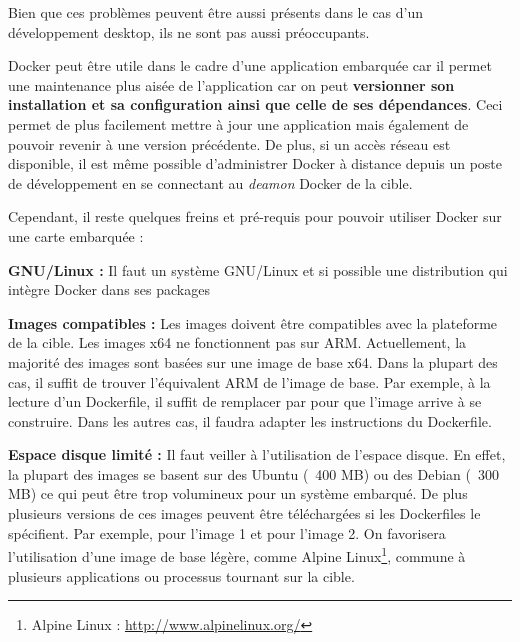 Bien que ces problèmes peuvent être aussi présents dans le cas d'un développement desktop, ils ne sont pas aussi préoccupants.

Docker peut être utile dans le cadre d'une application embarquée car il permet une maintenance plus aisée de l'application car on peut \textbf{versionner son installation et sa configuration ainsi que celle de ses dépendances}. Ceci permet de plus facilement mettre à jour une application mais également de pouvoir revenir à une version précédente. De plus, si un accès réseau est disponible, il est même possible d'administrer Docker à distance depuis un poste de développement en se connectant au \textit{deamon} Docker de la cible.

Cependant, il reste quelques freins et pré-requis pour pouvoir utiliser Docker sur une carte embarquée :

\textbf{GNU/Linux : } Il faut un système GNU/Linux et si possible une distribution qui intègre Docker dans ses packages

\textbf{Images compatibles : } Les images doivent être compatibles avec la plateforme de la cible. Les images x64 ne fonctionnent pas sur ARM. Actuellement, la majorité des images sont basées sur une image de base x64. Dans la plupart des cas, il suffit de trouver l'équivalent ARM de l'image de base. Par exemple, à la lecture d'un Dockerfile, il suffit de remplacer  par  pour que l'image arrive à se construire. Dans les autres cas, il faudra adapter les instructions du Dockerfile.

\textbf{Espace disque limité : } Il faut veiller à l'utilisation de l'espace disque. En effet, la plupart des images se basent sur des Ubuntu (~400 MB) ou des Debian (~300 MB) ce qui peut être trop volumineux pour un système embarqué. De plus plusieurs versions de ces images peuvent être téléchargées si les Dockerfiles le spécifient. Par exemple,  pour l'image 1 et  pour l'image 2. On favorisera l'utilisation d'une image de base légère, comme Alpine Linux\footnote{Alpine Linux : \url{http://www.alpinelinux.org/}}, commune à plusieurs applications ou processus tournant sur la cible. 